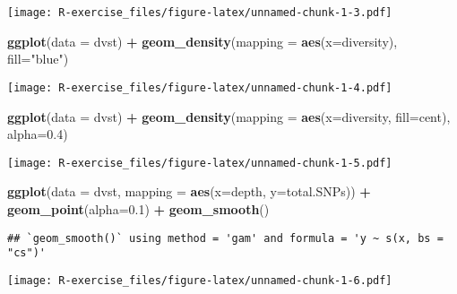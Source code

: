 \documentclass[
]{article}
\newenvironment{Shaded}{\begin{snugshade}}{\end{snugshade}}
\newcommand{\AttributeTok}[1]{\textcolor[rgb]{0.13,0.29,0.53}{#1}}
\newcommand{\FloatTok}[1]{\textcolor[rgb]{0.00,0.00,0.81}{#1}}
\newcommand{\FunctionTok}[1]{\textcolor[rgb]{0.13,0.29,0.53}{\textbf{#1}}}
\newcommand{\NormalTok}[1]{#1}
\newcommand{\SpecialCharTok}[1]{\textcolor[rgb]{0.81,0.36,0.00}{\textbf{#1}}}
\newcommand{\StringTok}[1]{\textcolor[rgb]{0.31,0.60,0.02}{#1}}
\begin{document}
\texttt{[image: R-exercise\_files/figure-latex/unnamed-chunk-1-3.pdf]}

\begin{Shaded}
\begin{Highlighting}[]
\FunctionTok{ggplot}\NormalTok{(}\AttributeTok{data =}\NormalTok{ dvst) }\SpecialCharTok{+} \FunctionTok{geom\_density}\NormalTok{(}\AttributeTok{mapping =} \FunctionTok{aes}\NormalTok{(}\AttributeTok{x=}\NormalTok{diversity), }\AttributeTok{fill=}\StringTok{"blue"}\NormalTok{)}
\end{Highlighting}
\end{Shaded}

\texttt{[image: R-exercise\_files/figure-latex/unnamed-chunk-1-4.pdf]}

\begin{Shaded}
\begin{Highlighting}[]
\FunctionTok{ggplot}\NormalTok{(}\AttributeTok{data =}\NormalTok{ dvst) }\SpecialCharTok{+} \FunctionTok{geom\_density}\NormalTok{(}\AttributeTok{mapping =} \FunctionTok{aes}\NormalTok{(}\AttributeTok{x=}\NormalTok{diversity, }\AttributeTok{fill=}\NormalTok{cent), }\AttributeTok{alpha=}\FloatTok{0.4}\NormalTok{)}
\end{Highlighting}
\end{Shaded}

\texttt{[image: R-exercise\_files/figure-latex/unnamed-chunk-1-5.pdf]}

\begin{Shaded}
\begin{Highlighting}[]
\FunctionTok{ggplot}\NormalTok{(}\AttributeTok{data =}\NormalTok{ dvst, }\AttributeTok{mapping =} \FunctionTok{aes}\NormalTok{(}\AttributeTok{x=}\NormalTok{depth, }\AttributeTok{y=}\NormalTok{total.SNPs)) }\SpecialCharTok{+} \FunctionTok{geom\_point}\NormalTok{(}\AttributeTok{alpha=}\FloatTok{0.1}\NormalTok{) }\SpecialCharTok{+} \FunctionTok{geom\_smooth}\NormalTok{()}
\end{Highlighting}
\end{Shaded}

\begin{verbatim}
## `geom_smooth()` using method = 'gam' and formula = 'y ~ s(x, bs = "cs")'
\end{verbatim}

\texttt{[image: R-exercise\_files/figure-latex/unnamed-chunk-1-6.pdf]}
\end{document}
